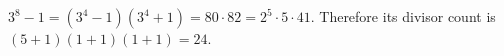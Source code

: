 $3^8-1=(3^4-1)(3^4+1)=80\cdot82=2^5\cdot5\cdot41$. Therefore its divisor count is $(5+1)(1+1)(1+1)=\boxed{24}$.
